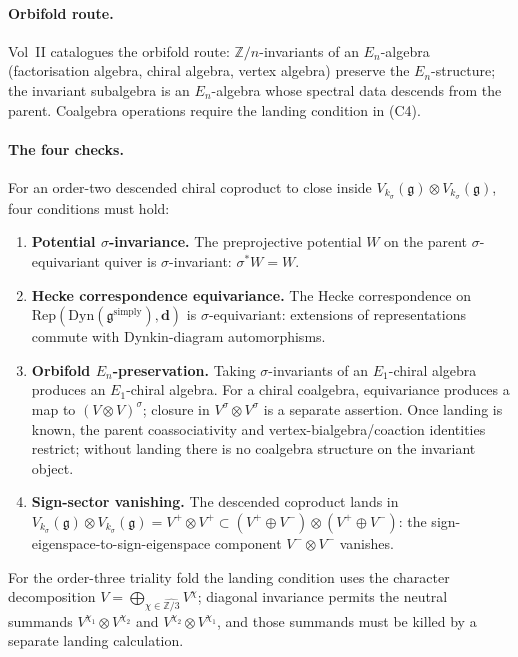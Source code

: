 \documentclass[11pt]{amsart}
\theoremstyle{definition}
\theoremstyle{remark}
\providecommand{\fg}{\mathfrak{g}}
\begin{document}
\paragraph{Orbifold route.}
Vol~II catalogues the orbifold route: $\mathbb{Z}/n$-invariants of an
$E_n$-algebra (factorisation algebra, chiral algebra, vertex algebra)
preserve the $E_n$-structure; the invariant subalgebra is an
$E_n$-algebra whose spectral data descends from the parent. Coalgebra
operations require the landing condition in \textup{(C4)}.

\paragraph{The four checks.}
For an order-two descended chiral coproduct to close inside
$V_{k_\sigma}(\fg) \otimes V_{k_\sigma}(\fg)$, four conditions must
hold:
\begin{enumerate}[label=\textup{(C\arabic*)}]
\item \textbf{Potential $\sigma$-invariance.}
  The preprojective potential $W$ on the parent $\sigma$-equivariant
  quiver is $\sigma$-invariant: $\sigma^* W = W$.
\item \textbf{Hecke correspondence equivariance.}
  The Hecke correspondence on
  $\mathrm{Rep}(\mathrm{Dyn}(\fg^{\mathrm{simply}}), \mathbf{d})$ is
  $\sigma$-equivariant: extensions of representations commute with
  Dynkin-diagram automorphisms.
\item \textbf{Orbifold $E_n$-preservation.}
  Taking $\sigma$-invariants of an $E_1$-chiral algebra produces an
  $E_1$-chiral algebra. For a chiral coalgebra, equivariance produces
  a map to $(V\otimes V)^\sigma$; closure in
  $V^\sigma\otimes V^\sigma$ is a separate assertion. Once landing is
  known, the parent coassociativity and vertex-bialgebra/coaction
  identities restrict; without landing there is no coalgebra structure
  on the invariant object.
\item \textbf{Sign-sector vanishing.}
  The descended coproduct lands in
  $V_{k_\sigma}(\fg) \otimes V_{k_\sigma}(\fg)
  = V^+ \otimes V^+ \subset
  (V^+ \oplus V^-) \otimes (V^+ \oplus V^-)$: the
  sign-eigenspace-to-sign-eigenspace component
  $V^- \otimes V^-$ vanishes.
\end{enumerate}
For the order-three triality fold the landing condition uses the
character decomposition
$V=\bigoplus_{\chi\in\widehat{\mathbb Z/3}}V^\chi$; diagonal
invariance permits the neutral summands
$V^{\chi_1}\otimes V^{\chi_2}$ and
$V^{\chi_2}\otimes V^{\chi_1}$, and those summands must be killed by a
separate landing calculation.
\end{document}
